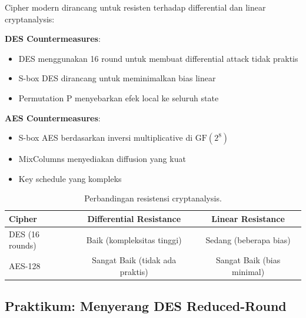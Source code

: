 Cipher modern dirancang untuk resisten terhadap differential dan linear cryptanalysis:

\textbf{DES Countermeasures}:
\begin{itemize}
  \item DES menggunakan 16 round untuk membuat differential attack tidak praktis
  \item S-box DES dirancang untuk meminimalkan bias linear
  \item Permutation P menyebarkan efek local ke seluruh state
\end{itemize}

\textbf{AES Countermeasures}:
\begin{itemize}
  \item S-box AES berdasarkan inversi multiplicative di $\mathrm{GF}(2^8)$
  \item MixColumns menyediakan diffusion yang kuat
  \item Key schedule yang kompleks
\end{itemize}

\begin{table}[htbp]
  \centering
  \small
  \begin{tabular}{lcc}
    \toprule
    Cipher & Differential Resistance & Linear Resistance \\
    \midrule
    DES (16 rounds) & Baik (kompleksitas tinggi) & Sedang (beberapa bias) \\
    AES-128 & Sangat Baik (tidak ada praktis) & Sangat Baik (bias minimal) \\
    \bottomrule
  \end{tabular}
  \caption{Perbandingan resistensi cryptanalysis.}
\end{table}

\subsection{Praktikum: Menyerang DES Reduced-Round}

